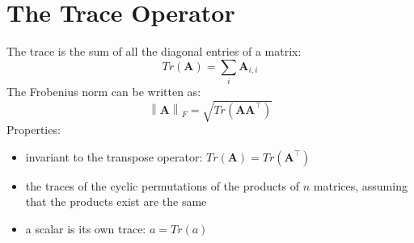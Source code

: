 \documentclass[11pt,twocolumn]{report}
\newcommand{\norm}[1]{\left\lVert#1\right\rVert}
\begin{document}
\section{The Trace Operator}
The trace is the sum of all the diagonal entries of a matrix:
\begin{equation}
  Tr(\bm{A}) = \sum_i \bm{A}_{i, i}
\end{equation}
The Frobenius norm can be written as:
\begin{equation}
  \norm{\bm{A}}_F = \sqrt{Tr(\bm{AA}^\intercal)}
\end{equation}
Properties:
\begin{itemize}
  \item invariant to the transpose operator: $Tr(\bm{A}) = Tr(\bm{A}^\intercal)$
  \item the traces of the cyclic permutations of the products of $n$ matrices,
    assuming that the products exist are the same
  \item a scalar is its own trace: $a = Tr(a)$
\end{itemize}
\end{document}
